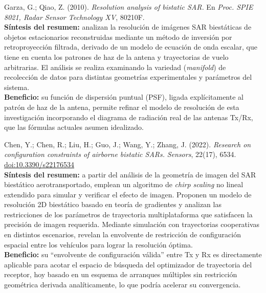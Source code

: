 \documentclass[11pt,a4paper]{report}
\begin{document}
\begin{enumerate}[label=\textbf{[A\arabic*]}, leftmargin=2.2cm, itemsep=10pt]
\item Garza, G.; Qiao, Z. (2010). \textit{Resolution analysis of bistatic
SAR.} En \emph{Proc. SPIE 8021, Radar Sensor Technology XV}, 80210F.
\cite{garza2010}\\
\textbf{Síntesis del resumen:} analizan la resolución de imágenes SAR
biestáticas de objetos estacionarios reconstruidas mediante un método de
inversión por retroproyección filtrada, derivado de un modelo de ecuación de
onda escalar, que tiene en cuenta los patrones de haz de la antena y
trayectorias de vuelo arbitrarias. El análisis se realiza examinando la
variedad (\emph{manifold}) de recolección de datos para distintas geometrías
experimentales y parámetros del sistema.\\
\textbf{Beneficio:} su función de dispersión puntual (PSF), ligada
explícitamente al patrón de haz de la antena, permite refinar el modelo de
resolución de esta investigación incorporando el diagrama de radiación real
de las antenas Tx/Rx, que las fórmulas actuales asumen idealizado.

\item Chen, Y.; Chen, R.; Liu, H.; Guo, J.; Wang, Y.; Zhang, J. (2022).
\textit{Research on configuration constraints of airborne bistatic SARs.}
\emph{Sensors}, 22(17), 6534.
\href{https://doi.org/10.3390/s22176534}{doi:10.3390/s22176534}
\cite{chen2022}\\
\textbf{Síntesis del resumen:} a partir del análisis de la geometría de
imagen del SAR biestático aerotransportado, emplean un algoritmo de
\emph{chirp scaling} no lineal extendido para simular y verificar el efecto
de imagen. Proponen un modelo de resolución 2D biestático basado en teoría
de gradientes y analizan las restricciones de los parámetros de trayectoria
multiplataforma que satisfacen la precisión de imagen requerida. Mediante
simulación con trayectorias cooperativas en distintos escenarios, revelan la
envolvente de restricción de configuración espacial entre los vehículos
para lograr la resolución óptima.\\
\textbf{Beneficio:} su ``envolvente de configuración válida'' entre Tx y Rx
es directamente aplicable para acotar el espacio de búsqueda del
optimizador de trayectoria del receptor, hoy basado en un esquema de
arranques múltiples sin restricción geométrica derivada analíticamente, lo
que podría acelerar su convergencia.

\end{enumerate}

\end{document}

